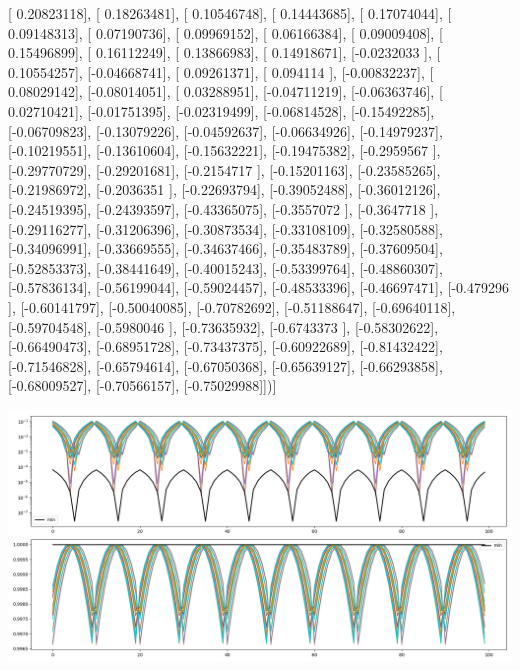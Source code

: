 \documentclass{article}
\begin{document}
       [ 0.20823118],
       [ 0.18263481],
       [ 0.10546748],
       [ 0.14443685],
       [ 0.17074044],
       [ 0.09148313],
       [ 0.07190736],
       [ 0.09969152],
       [ 0.06166384],
       [ 0.09009408],
       [ 0.15496899],
       [ 0.16112249],
       [ 0.13866983],
       [ 0.14918671],
       [-0.0232033 ],
       [ 0.10554257],
       [-0.04668741],
       [ 0.09261371],
       [ 0.094114  ],
       [-0.00832237],
       [ 0.08029142],
       [-0.08014051],
       [ 0.03288951],
       [-0.04711219],
       [-0.06363746],
       [ 0.02710421],
       [-0.01751395],
       [-0.02319499],
       [-0.06814528],
       [-0.15492285],
       [-0.06709823],
       [-0.13079226],
       [-0.04592637],
       [-0.06634926],
       [-0.14979237],
       [-0.10219551],
       [-0.13610604],
       [-0.15632221],
       [-0.19475382],
       [-0.2959567 ],
       [-0.29770729],
       [-0.29201681],
       [-0.2154717 ],
       [-0.15201163],
       [-0.23585265],
       [-0.21986972],
       [-0.2036351 ],
       [-0.22693794],
       [-0.39052488],
       [-0.36012126],
       [-0.24519395],
       [-0.24393597],
       [-0.43365075],
       [-0.3557072 ],
       [-0.3647718 ],
       [-0.29116277],
       [-0.31206396],
       [-0.30873534],
       [-0.33108109],
       [-0.32580588],
       [-0.34096991],
       [-0.33669555],
       [-0.34637466],
       [-0.35483789],
       [-0.37609504],
       [-0.52853373],
       [-0.38441649],
       [-0.40015243],
       [-0.53399764],
       [-0.48860307],
       [-0.57836134],
       [-0.56199044],
       [-0.59024457],
       [-0.48533396],
       [-0.46697471],
       [-0.479296  ],
       [-0.60141797],
       [-0.50040085],
       [-0.70782692],
       [-0.51188647],
       [-0.69640118],
       [-0.59704548],
       [-0.5980046 ],
       [-0.73635932],
       [-0.6743373 ],
       [-0.58302622],
       [-0.66490473],
       [-0.68951728],
       [-0.73437375],
       [-0.60922689],
       [-0.81432422],
       [-0.71546828],
       [-0.65794614],
       [-0.67050368],
       [-0.65639127],
       [-0.66293858],
       [-0.68009527],
       [-0.70566157],
       [-0.75029988]])]
\begin{center}
\includegraphics[scale=.9]{report_pickled_controls19/control_dpn_all}

\end{center}
\end{document}
